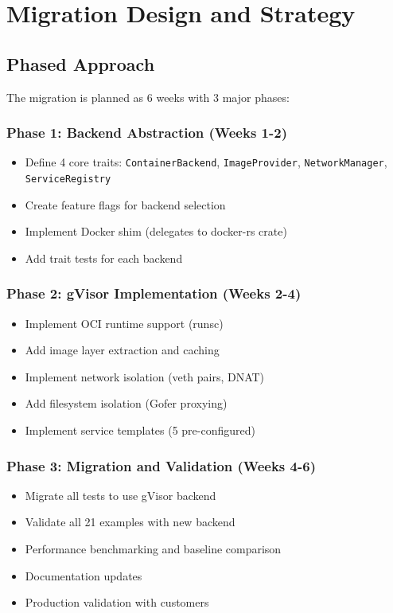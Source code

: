 \documentclass[12pt,twoside,openright]{book}
\theoremstyle{plain}
\theoremstyle{definition}
\theoremstyle{remark}
\begin{document}
\chapter{Migration Design and Strategy}

\section{Phased Approach}

The migration is planned as 6 weeks with 3 major phases:

\subsection{Phase 1: Backend Abstraction (Weeks 1-2)}

\begin{itemize}
  \item Define 4 core traits: \texttt{ContainerBackend}, \texttt{ImageProvider}, \texttt{NetworkManager}, \texttt{ServiceRegistry}
  \item Create feature flags for backend selection
  \item Implement Docker shim (delegates to docker-rs crate)
  \item Add trait tests for each backend
\end{itemize}

\subsection{Phase 2: gVisor Implementation (Weeks 2-4)}

\begin{itemize}
  \item Implement OCI runtime support (runsc)
  \item Add image layer extraction and caching
  \item Implement network isolation (veth pairs, DNAT)
  \item Add filesystem isolation (Gofer proxying)
  \item Implement service templates (5 pre-configured)
\end{itemize}

\subsection{Phase 3: Migration and Validation (Weeks 4-6)}

\begin{itemize}
  \item Migrate all tests to use gVisor backend
  \item Validate all 21 examples with new backend
  \item Performance benchmarking and baseline comparison
  \item Documentation updates
  \item Production validation with customers
\end{itemize}
\end{document}
